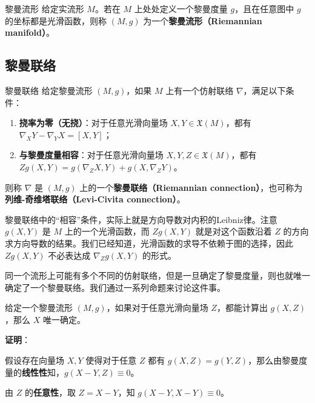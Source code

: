 \begin{definition}{黎曼流形}
给定实流形 $M$。若在 $M$ 上处处定义一个黎曼度量 $g$，且在任意图中 $g$ 的坐标都是光滑函数，则称 $(M, g)$ 为一个\textbf{黎曼流形（Riemannian manifold）}。
\end{definition}





\subsection{黎曼联络}

\begin{definition}{黎曼联络}\label{RieCon_def1}
给定黎曼流形 $(M, g)$，如果 $M$ 上有一个仿射联络 $\nabla$，满足以下条件：
\begin{enumerate}
\item \textbf{挠率为零（无挠）}：对于任意光滑向量场 $X, Y\in\mathfrak{X}(M)$，都有 $\nabla_XY-\nabla_YX={[X, Y]}$；
\item \textbf{与黎曼度量相容}：对于任意光滑向量场 $X, Y, Z\in\mathfrak{X}(M)$，都有 $Zg(X, Y)=g(\nabla_ZX, Y)+g(X, \nabla_ZY)$。
\end{enumerate}
则称 $\nabla$ 是 $(M, g)$ 上的一个\textbf{黎曼联络（Riemannian connection）}，也可称为\textbf{列维-奇维塔联络（Levi-Civita connection）}。
\end{definition}

黎曼联络中的“相容”条件，实际上就是方向导数对内积的Leibniz律。注意 $g(X, Y)$ 是 $M$ 上的一个光滑函数，而 $Zg(X, Y)$ 就是对这个函数沿着 $Z$ 的方向求方向导数的结果。我们已经知道，光滑函数的求导不依赖于图的选择，因此 $Zg(X, Y)$ 不必表达成 $\nabla_Zg(X, Y)$ 的形式。

同一个流形上可能有多个不同的仿射联络，但是一旦确定了黎曼度量，则也就唯一确定了一个黎曼联络。我们通过一系列命题来讨论这件事。







\begin{lemma}{}\label{RieCon_lem1}
给定一个黎曼流形 $(M, g)$，如果对于任意光滑向量场 $Z$，都能计算出 $g(X, Z)$，那么 $X$ 唯一确定。
\end{lemma}

\textbf{证明}：

假设存在向量场 $X, Y$ 使得对于任意 $Z$ 都有 $g(X, Z)=g(Y, Z)$，那么由黎曼度量的\textbf{线性性}知，$g(X-Y, Z)\equiv 0$。

由 $Z$ 的\textbf{任意性}，取 $Z=X-Y$，知 $g(X-Y, X-Y)\equiv 0$。

